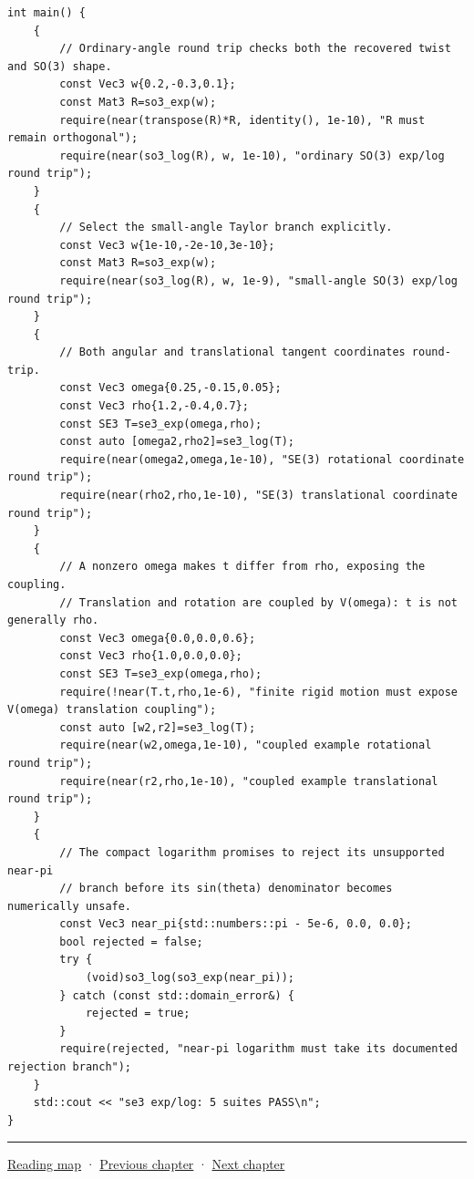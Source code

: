 \begin{verbatim}
int main() {
    {
        // Ordinary-angle round trip checks both the recovered twist and SO(3) shape.
        const Vec3 w{0.2,-0.3,0.1};
        const Mat3 R=so3_exp(w);
        require(near(transpose(R)*R, identity(), 1e-10), "R must remain orthogonal");
        require(near(so3_log(R), w, 1e-10), "ordinary SO(3) exp/log round trip");
    }
    {
        // Select the small-angle Taylor branch explicitly.
        const Vec3 w{1e-10,-2e-10,3e-10};
        const Mat3 R=so3_exp(w);
        require(near(so3_log(R), w, 1e-9), "small-angle SO(3) exp/log round trip");
    }
    {
        // Both angular and translational tangent coordinates round-trip.
        const Vec3 omega{0.25,-0.15,0.05};
        const Vec3 rho{1.2,-0.4,0.7};
        const SE3 T=se3_exp(omega,rho);
        const auto [omega2,rho2]=se3_log(T);
        require(near(omega2,omega,1e-10), "SE(3) rotational coordinate round trip");
        require(near(rho2,rho,1e-10), "SE(3) translational coordinate round trip");
    }
    {
        // A nonzero omega makes t differ from rho, exposing the coupling.
        // Translation and rotation are coupled by V(omega): t is not generally rho.
        const Vec3 omega{0.0,0.0,0.6};
        const Vec3 rho{1.0,0.0,0.0};
        const SE3 T=se3_exp(omega,rho);
        require(!near(T.t,rho,1e-6), "finite rigid motion must expose V(omega) translation coupling");
        const auto [w2,r2]=se3_log(T);
        require(near(w2,omega,1e-10), "coupled example rotational round trip");
        require(near(r2,rho,1e-10), "coupled example translational round trip");
    }
    {
        // The compact logarithm promises to reject its unsupported near-pi
        // branch before its sin(theta) denominator becomes numerically unsafe.
        const Vec3 near_pi{std::numbers::pi - 5e-6, 0.0, 0.0};
        bool rejected = false;
        try {
            (void)so3_log(so3_exp(near_pi));
        } catch (const std::domain_error&) {
            rejected = true;
        }
        require(rejected, "near-pi logarithm must take its documented rejection branch");
    }
    std::cout << "se3 exp/log: 5 suites PASS\n";
}
\end{verbatim}

\begin{center}\rule{0.5\linewidth}{0.5pt}\end{center}

\hyperref[volume-reading-map]{Reading map} · \hyperref[02-foundations-ii-ch026-matrix-functions-and-nonlinear-least-squares]{Previous chapter} · \hyperref[02-foundations-ii-ch028-reliable-optimization-and-root-finding]{Next chapter}
